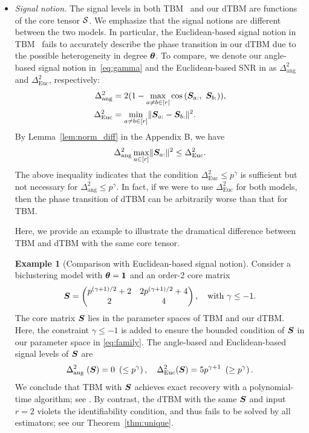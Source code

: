 \documentclass[journal]{IEEEtran}
\theoremstyle{definition}
\theoremstyle{definition}
\newtheorem{example}{Example}
\newcommand{\of}[1]{\left(#1\right)}
\begin{document}
\begin{itemize}[wide]
    \item \textit{Signal notion.} The signal levels in both TBM~\citep{han2020exact} and our dTBM are functions of the core tensor $\mathcal{S}$. We emphasize that the signal notions are different between the two models. In particular, the Euclidean-based signal notion in TBM~\cite{han2020exact} fails to accurately describe the phase transition in our dTBM due to the possible heterogeneity in degree $\boldsymbol{\theta}$. To compare, we denote our angle-based signal notion in~\eqref{eq:gamma} and the Euclidean-based SNR in \cite{han2020exact} as $\Delta_{\text{ang}}^2$ and $\Delta_{\text{Euc}}^2$, respectively:
    \begin{align}
        \Delta_{\text{ang}}^2 &=  2(1 - \max_{a \neq b\in [r]}\cos \of{\mS_{a:},\  \mS_{b:}} ), \\ 
 \Delta_{\text{Euc}}^2 &= \min_{a \neq b \in [r]} \onormSize{}{\mS_{a:} - \mS_{b:}}^2.
    \end{align}
By Lemma~\ref{lem:norm_diff} in the Appendix B, we have 
\begin{equation}\label{eq:signalcompare}
     \Delta_{\text{ang}}^2  \max_{a \in [r]}\onormSize{}{\mS_{a:}}^2 \leq \Delta_{\text{Euc}}^2.
\end{equation}
The above inequality indicates that the condition $\Delta_{\text{Euc}}^2 \leq p^{\gamma}$ is sufficient but not necessary for $\Delta_{\text{ang}}^2 \leq p^{\gamma}$. In fact, if we were to use $\Delta_{\text{Euc}}^2$ for both models, then the phase transition of dTBM can be arbitrarily worse than that for TBM. 


Here, we provide an example to illustrate the dramatical difference between TBM and dTBM with the same core tensor.  

\begin{example}[Comparison with Euclidean-based signal notion] \label{example:euc_alg} Consider a biclustering model with $\boldsymbol{\theta}=\mathbf{1}$ and an order-2 core matrix 
\begin{equation}
    \bm S = \begin{pmatrix} p^{(\gamma+1)/2 } + 2  & 2 p^{(\gamma+1)/2} + 4\\
    2 & 4
    \end{pmatrix},\quad \text{with}\ \gamma \leq -1.
\end{equation}
The core matrix $\bm S$ lies in the parameter spaces of TBM and our dTBM. Here, the constraint $\gamma \leq -1$ is added to ensure the bounded condition of $\bm S$ in our parameter space in \eqref{eq:family}. The angle-based and Euclidean-based signal levels of $\bm S$ are 
\begin{equation}
    \Delta_{\text{ang }}^2(\mS) = 0 \ \left(\leq p^{\gamma}\right), \quad \Delta_{\text{Euc}}^2(\mS) = 5 p^{\gamma + 1} \ \left(\geq p^{\gamma}\right).
\end{equation}
We conclude that TBM with $\bm S$ achieves exact recovery with a polynomial-time algorithm; see \cite[Theorem 4]{han2020exact}. By contrast, the dTBM with the same $\bm S$ and input $r=2$ violets the identifiability condition, and thus fails to be solved by all estimators; see our Theorem~\ref{thm:unique}. 
\end{example}
    

\end{itemize}
\end{document}
